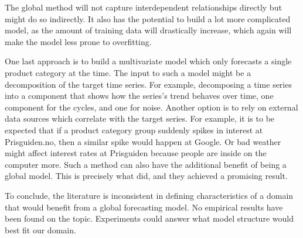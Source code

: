 The global method will not capture interdependent relationships directly
but might do so indirectly. It also has the potential to build a lot more complicated model,
as the amount of training data will drastically increase, which again will make the model less prone to
overfitting.

One last approach is to build a multivariate model which only forecasts a single product category at the time.
The input to such a model might be a decomposition of the target time series.
For example, decomposing a time series into a component that shows how the series's trend behaves over time,
one component for the cycles, and one for noise.
Another option is to rely on external data sources which correlate with the target series.
For example, it is to be expected that if a product category group suddenly spikes in interest at Prisguiden.no,
then a similar spike would happen at Google.
Or bad weather might affect interest rates at Prisguiden because people are inside on the computer more.
Such a method can also have the additional benefit of being a global model.
This is precisely what \cite{Laptev} did, and they achieved a promising result.

To conclude,
the literature is inconsistent in defining characteristics of a domain that would benefit from a global forecasting model.
No empirical results have been found on the topic. Experiments could answer what model structure would best fit our domain.


